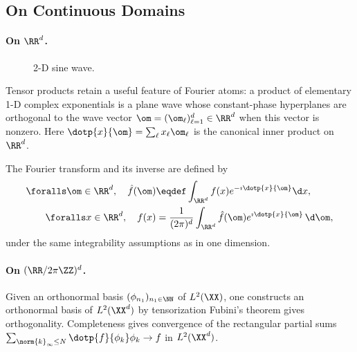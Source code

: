 \subsection{On Continuous Domains}

\paragraph{On \texorpdfstring{$\RR^d$}{Euclidean Space}.}

\begin{figure}[tbp]
\centering
{}
\caption{2-D sine wave.}
\label{fig-review-fourier-wave}
\end{figure}
Tensor products retain a useful feature of Fourier atoms: a product of elementary 1-D complex exponentials is a plane wave
whose constant-phase hyperplanes are orthogonal to the wave vector $\om=(\om_\ell)_{\ell=1}^d \in \RR^d$ when this vector is nonzero. Here $\dotp{x}{\om} = \sum_\ell x_\ell \om_\ell$ is the canonical inner product on $\RR^d$.

The Fourier transform and its inverse are defined by
\begin{align*}
	\foralls \om \in \RR^d, \quad \hat f(\om) &\eqdef \int_{\RR^d} f(x) e^{-\imath\dotp{x}{\om}} \d x, \\
	\foralls x \in \RR^d, \quad  f(x) &= \frac{1}{(2\pi)^d} \int_{\RR^d}\hat f(\om)e^{\imath\dotp{x}{\om}}\,\d\om,
\end{align*}
under the same integrability assumptions as in one dimension.




\paragraph{On \texorpdfstring{$(\RR/2\pi\ZZ)^d$}{the Torus}.}

Given an orthonormal basis $(\phi_{n_1})_{n_1 \in \NN}$ of $L^2(\XX)$, one constructs an orthonormal basis of $L^2(\XX^d)$ by tensorization
Fubini's theorem gives orthogonality. Completeness gives convergence of the rectangular partial sums $\sum_{\norm{k}_\infty \leq N} \dotp{f}{\phi_k} \phi_k \rightarrow f$ in $L^2(\XX^d)$.

